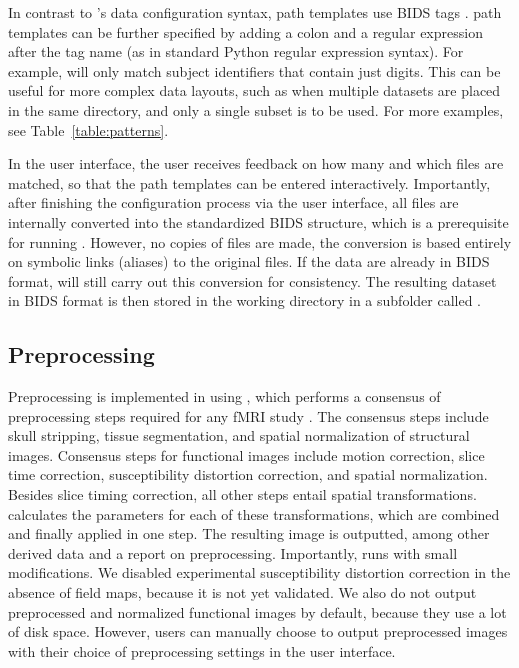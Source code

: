 

In contrast to 's data configuration syntax, 
path templates use BIDS tags \parencite{10.1038/sdata.2016.44}. 
path templates can be further specified by adding a colon and a regular
expression after the tag name (as in standard Python regular expression
syntax). For example,  will only match
subject identifiers that contain just digits. This can be useful for more
complex data layouts, such as when multiple datasets are placed in the same
directory, and only a single subset is to be used. For more examples, see
Table~\ref{table:patterns}.

In the  user interface, the user receives feedback on how
many and which files are matched, so that the path templates can be entered
interactively. Importantly, after finishing the configuration process via
the user interface, all files are internally converted into the
standardized BIDS structure, which is a prerequisite for running
. However, no copies of files are made, the conversion is
based entirely on symbolic links (aliases) to the original files. If the
data are already in BIDS format,  will still carry out this
conversion for consistency. The resulting dataset in BIDS format is then
stored in the working directory in a subfolder called .

\subsection{Preprocessing}

Preprocessing is implemented in  using ,
which performs a consensus of preprocessing steps required for any fMRI
study \parencite{10.1038/s41592-018-0235-4}. The consensus steps include skull
stripping, tissue segmentation, and spatial normalization of structural
images. Consensus steps for functional images include motion correction,
slice time correction, susceptibility distortion correction, and spatial
normalization. Besides slice timing correction, all other steps entail
spatial transformations.  calculates the parameters for each
of these transformations, which are combined and finally applied in one
step. The resulting image is outputted, among other derived data and a
report on preprocessing. Importantly,  runs 
with small modifications. We disabled experimental susceptibility
distortion correction in the absence of field maps, because it is not yet
validated. We also do not output preprocessed and normalized functional
images by default, because they use a lot of disk space. However, users can
manually choose to output preprocessed images with their choice of
preprocessing settings in the user interface.


